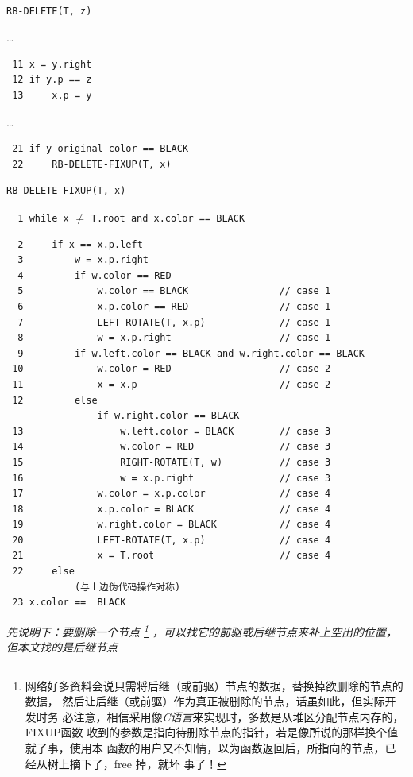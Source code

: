 \documentclass[a4paper, 11pt]{article}
\begin{document}
\begin{minipage}{\textwidth}

\begin{verbatim}

RB-DELETE(T, z)
\end{verbatim}
\ldots
\begin{verbatim}
 11 x = y.right
 12 if y.p == z
 13     x.p = y
\end{verbatim}
\ldots
\begin{verbatim}
 21 if y-original-color == BLACK
 22     RB-DELETE-FIXUP(T, x)

\end{verbatim}

\begin{verbatim}
RB-DELETE-FIXUP(T, x)
\end{verbatim}
\verb|  1 while x| $\neq$ \verb|T.root and x.color == BLACK|
\begin{verbatim}
  2     if x == x.p.left
  3         w = x.p.right
  4         if w.color == RED
  5             w.color == BLACK                // case 1
  6             x.p.color == RED                // case 1
  7             LEFT-ROTATE(T, x.p)             // case 1
  8             w = x.p.right                   // case 1
  9         if w.left.color == BLACK and w.right.color == BLACK
 10             w.color = RED                   // case 2
 11             x = x.p                         // case 2
 12         else
                if w.right.color == BLACK       
 13                 w.left.color = BLACK        // case 3
 14                 w.color = RED               // case 3
 15                 RIGHT-ROTATE(T, w)          // case 3
 16                 w = x.p.right               // case 3
 17             w.color = x.p.color             // case 4
 18             x.p.color = BLACK               // case 4
 19             w.right.color = BLACK           // case 4
 20             LEFT-ROTATE(T, x.p)             // case 4
 21             x = T.root                      // case 4
 22     else
            (与上边伪代码操作对称)
 23 x.color ==  BLACK    

\end{verbatim}

\end{minipage}
\emph{先说明下：要删除一个节点
	\footnote{网络好多资料会说只需将后继（或前驱）节点的数据，替换掉欲删除的节点的数据，
		然后让后继（或前驱）作为真正被删除的节点，话虽如此，但实际开发时务
		必注意，相信采用像\textit{C语言}来实现时，多数是从堆区分配节点内存的，FIXUP函数
		收到的参数是指向待删除节点的指针，若是像所说的那样换个值就了事，使用本
		函数的用户又不知情，以为函数返回后，所指向的节点，已经从树上摘下了，free 掉，就坏
		事了！}
	，可以找它的前驱或后继节点来补上空出的位置，但本文找的是后继节点}
\end{document}
